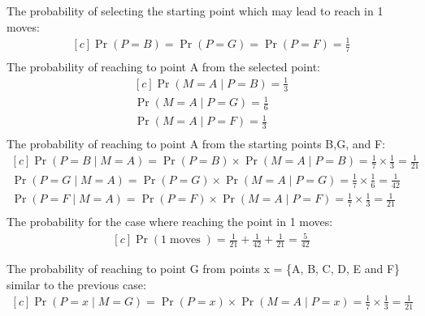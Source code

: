 \documentclass{article}
\DeclareMathOperator{\CondProb}{Pr}
\DeclareMathOperator{\moves}{moves}
\begin{document}
The probability of selecting the starting point which may lead to reach in 1 moves:
\begin{equation*}
	\begin{aligned}[c]
	\CondProb{(P = B)} = \CondProb{(P = G)} = \CondProb{(P = F)} = \frac{1}{7} \\
	\end{aligned}
\end{equation*}
The probability of reaching to point A from the selected point:
\begin{equation*}
	\begin{aligned}[c]
	\CondProb{(M = A \mid P = B)} = \frac{1}{3} \\
	\CondProb{(M = A \mid P = G)} = \frac{1}{6} \\
	\CondProb{(M = A \mid P = F)} = \frac{1}{3} \\
	\end{aligned}
\end{equation*}
The probability of reaching to point A from the starting points B,G, and F:
\begin{equation*}
	\begin{aligned}[c]
	\CondProb{(P = B \mid M = A)} = \CondProb{(P = B)}\times\CondProb{(M = A \mid P = B)} = \frac{1}{7}\times\frac{1}{3}  = \frac{1}{21}  \\
	\CondProb{(P = G \mid M = A)} = \CondProb{(P = G)}\times\CondProb{(M = A \mid P = G)} = \frac{1}{7}\times\frac{1}{6}  = \frac{1}{42}  \\
	\CondProb{(P = F \mid M = A)} = \CondProb{(P = F)}\times\CondProb{(M = A \mid P = F)} = \frac{1}{7}\times\frac{1}{3}  = \frac{1}{21}  \\
	\end{aligned}
\end{equation*}
The probability for the case where reaching the point in 1 moves:
\begin{equation*}
	\begin{aligned}[c]	
	\CondProb{(1 \moves)} =  \frac{1}{21} +  \frac{1}{42} + \frac{1}{21} =  \frac{5}{42}
	\end{aligned}
\end{equation*}

The probability of reaching to point G from points x = \{A, B, C, D, E and F\} similar to the previous case:
\begin{equation*}
	\begin{aligned}[c]
	\CondProb{(P = x \mid M = G)} = \CondProb{(P = x)}\times\CondProb{(M = A \mid P = x)} = \frac{1}{7}\times\frac{1}{3}  = \frac{1}{21}  \\
	\end{aligned}
\end{equation*}
\end{document}
